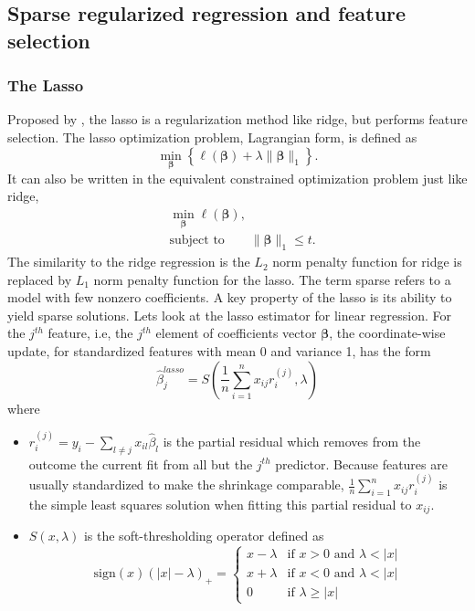 \subsection{Sparse regularized regression and feature selection}
\subsubsection{The Lasso}
Proposed by \citep{tibshirani1996regression}, the lasso is a regularization method like ridge, but performs feature selection. The lasso optimization problem, Lagrangian form, is defined as 
\begin{equation}
    \min_{\bm{\beta}} \left\{ \ell(\bm{\beta})+\lambda\|\bm{\beta}\|_1  \right\}. \label{eq1.6}
\end{equation}
It can also be written in the equivalent constrained optimization problem just like ridge,
\begin{equation}
    \begin{aligned}
    &\min_{\bm{\beta}} \ell(\bm{\beta}), \\
    &\text{subject to} \qquad \|\bm{\beta}\|_1 \leq t. \label{eq1.7}
    \end{aligned}
\end{equation}
The similarity to the ridge regression is the $L_2$ norm penalty function for ridge is replaced by $L_1$ norm penalty function for the lasso. The term sparse refers to a model with few nonzero coefficients. A key property of the lasso is its ability to yield sparse solutions. Lets look at the lasso estimator for linear regression. For the $j^{th}$ feature, i.e, the $j^{th}$ element of coefficients vector $\bm{\beta}$, the coordinate-wise update, for standardized features with mean 0 and variance 1, has the form
\begin{equation}
    \hat{\beta}_j^{lasso}=S(\frac{1}{n}\sum_{i=1}^{n}x_{ij}r_i^{(j)}, \lambda) \label{eq1.8}
\end{equation}
where 
\begin{itemize}
    \item $r_i^{(j)} = y_i-\sum_{l\neq j}x_{il}\hat{\beta}_l$ is the partial residual which removes from the outcome the current fit from all but the $j^{th}$ predictor. Because features are usually standardized to make the shrinkage comparable, $\frac{1}{n}\sum_{i=1}^{n}x_{ij}r_i^{(j)}$ is the simple least squares solution when fitting this partial residual to $x_{ij}$.
    \item $S(x, \lambda)$ is the soft-thresholding operator defined as 
    \begin{equation}
        \text{sign}(x)(|x|-\lambda)_+ = 
            \begin{cases}
                x-\lambda & \text{if $x>0$ and $\lambda<|x|$}\\
                x+\lambda & \text{if $x<0$ and $\lambda<|x|$}\\
                0 & \text{if $\lambda \geq |x|$}
            \end{cases} \label{eq1.9}      
    \end{equation}
\end{itemize}
